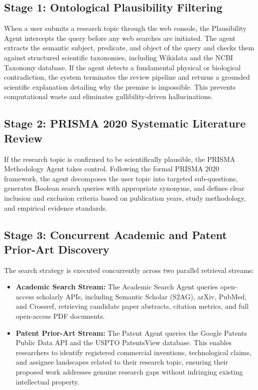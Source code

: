 \documentclass[11pt,a4paper]{article}
\begin{document}
\subsection{Stage 1: Ontological Plausibility Filtering}
When a user submits a research topic through the web console, the Plausibility Agent intercepts the query before any web searches are initiated. The agent extracts the semantic subject, predicate, and object of the query and checks them against structured scientific taxonomies, including Wikidata and the NCBI Taxonomy database. If the agent detects a fundamental physical or biological contradiction, the system terminates the review pipeline and returns a grounded scientific explanation detailing why the premise is impossible. This prevents computational waste and eliminates gullibility-driven hallucinations.

\subsection{Stage 2: PRISMA 2020 Systematic Literature Review}
If the research topic is confirmed to be scientifically plausible, the PRISMA Methodology Agent takes control. Following the formal PRISMA 2020 framework, the agent decomposes the user topic into targeted sub-questions, generates Boolean search queries with appropriate synonyms, and defines clear inclusion and exclusion criteria based on publication years, study methodology, and empirical evidence standards.

\subsection{Stage 3: Concurrent Academic and Patent Prior-Art Discovery}
The search strategy is executed concurrently across two parallel retrieval streams:
\begin{itemize}[leftmargin=*,noitemsep]
    \item \textbf{Academic Search Stream:} The Academic Search Agent queries open-access scholarly APIs, including Semantic Scholar (S2AG), arXiv, PubMed, and Crossref, retrieving candidate paper abstracts, citation metrics, and full open-access PDF documents.
    \item \textbf{Patent Prior-Art Stream:} The Patent Agent queries the Google Patents Public Data API and the USPTO PatentsView database. This enables researchers to identify registered commercial inventions, technological claims, and assignee landscapes related to their research topic, ensuring their proposed work addresses genuine research gaps without infringing existing intellectual property.
\end{itemize}
\end{document}
